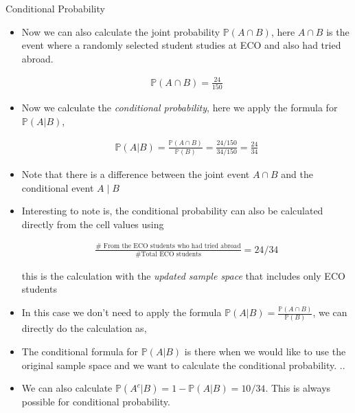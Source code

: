 \documentclass[8pt, usepdftitle = false]{beamer}
\begin{document}
\begin{frame}[allowframebreaks]{Conditional Probability}
\begin{itemize}
\item Now we can also calculate the \alert{joint probability} $\mathbb{P}(A \cap B)$, here $A\cap B$ is the event where a randomly selected student studies at ECO and also had tried abroad.  

\begin{align*}
\mathbb{P}(A \cap B) = \frac{24}{150}
\end{align*}


\framebreak


\item Now we calculate the \emph{conditional probability}, here we apply the formula for $\mathbb{P}(A | B)$, 

\begin{align*}
\mathbb{P}(A|B) = \frac{\mathbb{P}(A \cap B)}{\mathbb{P}(B)} = \frac{24/150}{34/150} = \frac{24}{34}
\end{align*}

\item Note that there is a difference between the joint event $A \cap B$ and the conditional event $A \mid B$


\medskip

\item Interesting to note is, the conditional probability can also be calculated directly from the cell values using


\begin{align*}
 \frac{\# \text{ From the ECO students who had tried abroad} }{\# \text{Total ECO students} } = 24/34
\end{align*}

this is the calculation with the \emph{updated sample space} that includes only ECO students

\medskip

\item In this case we don't need to apply the formula $\mathbb{P}(A|B) = \frac{\mathbb{P}(A \cap B)}{\mathbb{P}(B)} $, we can directly do the calculation as,


\item The conditional formula for $\mathbb{P}(A|B)$ is there when we would like to use the original sample space and we want to calculate the conditional probability. ..






\framebreak
\item We can also calculate $\mathbb{P}(A^c|B) = 1 - \mathbb{P}(A|B) = 10/34$. This is always possible for conditional probability.


\end{itemize}
\end{frame}
\end{document}
